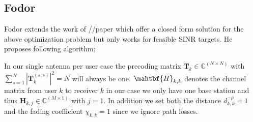 \subsection{Fodor}
Fodor extends the work of //paper which offer a closed form solution for the above optimization problem but only works for feasible SINR targets. He proposes following algorithm:
\begin{algorithm}
\end{algorithm}
In our single antenna per user case the precoding matrix $\mathbf{T}_k \in \mathbb{C}^{(N\times N)}$ with $\sum_{s=1}^N{|\mathbf{T}_k^{(s,s)}|^2}=N$ will always be one. $\mahtbf{H}_{k,k}$ denotes the channel matrix from user $k$ to receiver $k$ in our case we only have one base station and thus $\mathbf{H}_{k,j} \in \mathbb{C}^{(M\times 1)}$ with $j=1$. In addition we set both the distance $d^{-\rho}_{k,k}=1$ and the fading coefficient $\chi_{k,k}=1$ since we ignore path losses.

